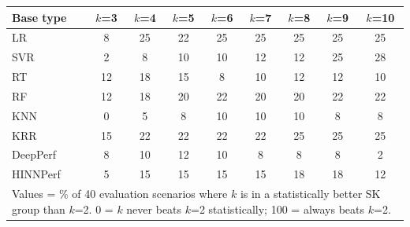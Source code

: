 \begin{tabular}{lcccccccc}
\toprule
Base type & $k$=3 & $k$=4 & $k$=5 & $k$=6 & $k$=7 & $k$=8 & $k$=9 & $k$=10 \\
\midrule
LR & 8 & 25 & 22 & 25 & 25 & 25 & 25 & 25 \\
SVR & 2 & 8 & 10 & 10 & 12 & 12 & 25 & 28 \\
RT & 12 & 18 & 15 & 8 & 10 & 12 & 12 & 10 \\
RF & 12 & 18 & 20 & 22 & 20 & 20 & 22 & 22 \\
KNN & 0 & 5 & 8 & 10 & 10 & 10 & 8 & 8 \\
KRR & 15 & 22 & 22 & 22 & 22 & 25 & 25 & 25 \\
DeepPerf & 8 & 10 & 12 & 10 & 8 & 8 & 8 & 2 \\
HINNPerf & 5 & 15 & 15 & 15 & 15 & 18 & 18 & 12 \\
\bottomrule
\multicolumn{9}{l}{\footnotesize Values = \% of 40 evaluation scenarios where $k$ is in a statistically better SK group than $k$=2. 0 = $k$ never beats $k$=2 statistically; 100 = always beats $k$=2.}} \\
\end{tabular}
